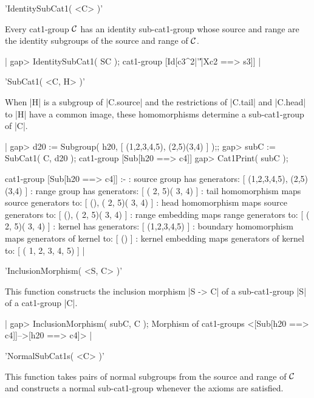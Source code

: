 
'IdentitySubCat1( <C> )'

Every  cat1-group  ${\cal  C}$ has  an   identity sub-cat1-group whose
source and range are the identity subgroups of the source and range of
${\cal C}$.

|    gap> IdentitySubCat1( SC );
    cat1-group [Id[c3^2|'\|'|Xc2 ==> s3]]  | 

%

'SubCat1( <C, H> )'

When |H| is a subgroup of  |C.source| and the restrictions of |C.tail|
and |C.head| to |H| have a common image, these homomorphisms determine
a sub-cat1-group of |C|.

|    gap> d20 := Subgroup( h20, [ (1,2,3,4,5), (2,5)(3,4) ] );;
    gap> subC := SubCat1( C, d20 );
    cat1-group [Sub[h20 ==> c4]] 
    gap> Cat1Print( subC );

    cat1-group [Sub[h20 ==> c4]] :- 
    : source group has generators:
      [ (1,2,3,4,5), (2,5)(3,4) ]
    :  range group has generators:
      [ ( 2, 5)( 3, 4) ]
    : tail homomorphism maps source generators to:
      [ (), ( 2, 5)( 3, 4) ]
    : head homomorphism maps source generators to:
      [ (), ( 2, 5)( 3, 4) ]
    : range embedding maps range generators to:
      [ ( 2, 5)( 3, 4) ]
    : kernel has generators:
      [ (1,2,3,4,5) ]
    : boundary homomorphism maps generators of kernel to:
      [ () ]
    : kernel embedding maps generators of kernel to:
      [ ( 1, 2, 3, 4, 5) ]   |

%

'InclusionMorphism( <S, C> )'

This  function   constructs the inclusion   morphism  |S  ->   C| of a
sub-cat1-group |S| of a cat1-group |C|.

|    gap> InclusionMorphism( subC, C );
    Morphism of cat1-groups <[Sub[h20 ==> c4]]-->[h20 ==> c4]>  |

%

'NormalSubCat1s( <C> )'

This  function takes  pairs of  normal  subgroups from  the source and
range of ${\cal C}$  and  constructs a normal sub-cat1-group  whenever
the axioms are satisfied.

